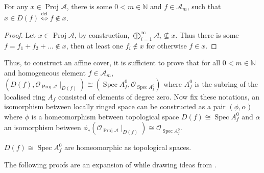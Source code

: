 \documentclass[a4paper,UKenglish,cleveref, autoref, thm-restate]{lipics-v2021}
\begin{document}
\begin{lemma}\label{lemma:choose_basic_open}
    For any $x\in \operatorname{Proj}\mathcal{A}$, there is some $0 < m \in \mathbb{N}$ and $f\in \mathcal{A}_m$, such that $x\in D(f)\stackrel{\mathsf{def}}{\iff}f\not\in x$.
\end{lemma}
\begin{proof}
    Let $x\in \operatorname{Proj}\mathcal A$, by construction, $\bigoplus_{i=1}^\infty\mathcal{A}_i\not\subseteq x$. Thus there is some $f=f_1+f_2+\dots\not\in x$, then at least one $f_i\not\in x$ for otherwise $f\in x$.
\end{proof}

Thus, to construct an affine cover, it is sufficient to prove that for all $0<m\in \mathbb{N}$ and homogeneous element $f\in\mathcal{A}_m$, $(D(f),\mathcal{O}_{\operatorname{Proj}\mathcal{A}}\!\mid_{D(f)})\cong (\operatorname{Spec} A^0_f, \mathcal{O}_{\operatorname{Spec} A^0_f})$ where $A^0_f$ is the subring of the localised ring $A_f$ consisted of elements of degree zero. Now fix these notations, an isomorphism between locally ringed space can be constructed as a pair $(\phi, \alpha)$ where $\phi$ is a homeomorphism between topological space $D(f)\cong\operatorname{Spec}A^0_f $ and $\alpha$ an isomorphism between
$\phi_*(\mathcal{O}_{\operatorname{Proj}\mathcal{A}}\!\mid_{D(f)})\cong \mathcal{O}_{\operatorname{Spec}A^0_f}$.

\begin{theorem}\label{thm:homeomorph}
    $D(f)\cong \operatorname{Spec}A^0_f$ are homeomorphic as topological spaces.
\end{theorem}
The following proofs are an expansion of \cite[II.2.5]{hartshorne1977graduate} while drawing ideas from \cite[II.4.5]{vakil24rising}.
\end{document}
